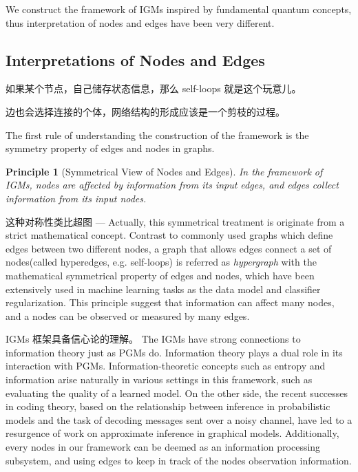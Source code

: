 \documentclass[10pt,onecolumn,letterpaper]{article}
\newtheorem{principle}[theorem]{Principle}
\begin{document}
\begin{CJK*}{UTF8}{gbsn}
We construct the framework of IGMs inspired by fundamental quantum concepts, thus interpretation of nodes and edges have been very different.

\subsection{Interpretations of Nodes and Edges}

如果某个节点，自己储存状态信息，那么 self-loops 就是这个玩意儿。

边也会选择连接的个体，网络结构的形成应该是一个剪枝的过程。

The first rule of understanding the construction of the framework is the symmetry property of edges and nodes in graphs.

\begin{principle}[Symmetrical View of Nodes and Edges]
\label{prin:sym}
In the framework of IGMs, nodes are affected by information from its input edges, and edges collect information from its input nodes.
\end{principle}

这种对称性类比超图 ---
Actually, this symmetrical treatment is originate from a strict mathematical concept. Contrast to commonly used graphs which define edges between two different nodes, a graph that allows edges connect a set of nodes(called hyperedges, e.g. self-loops) is referred as \emph{hypergraph} with the mathematical symmetrical property of edges and nodes, which have been extensively used in machine learning tasks as the data model and classifier regularization\cite{zhou2007learning}. This principle suggest that information can affect many nodes, and a nodes can be observed or measured by many edges. 

IGMs 框架具备信心论的理解。
The IGMs have strong connections to information theory just as PGMs do. Information theory plays a dual role in its interaction with PGMs. Information-theoretic concepts such as entropy and information arise naturally in various settings in this framework, such as evaluating the quality of a learned model. On the other side, the recent successes in coding theory, based on the relationship between inference in probabilistic models and the task of decoding messages sent over a noisy channel, have led to a resurgence of work on approximate inference in graphical models. Additionally, every nodes in our framework can be deemed as an information processing subsystem, and using edges to keep in track of the nodes observation information. 


\end{CJK*}
\end{document}
